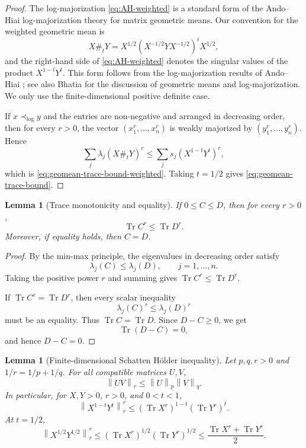 \documentclass[11pt]{amsart}
\numberwithin{equation}{section}
\newtheorem{lemma}[theorem]{Lemma}
\newcommand{\Tr}{\operatorname{Tr}}
\newcommand{\norm}[1]{\left\lVert #1\right\rVert}
\begin{document}
\begin{proof}
The log-majorization \eqref{eq:AH-weighted} is a standard form of the Ando--Hiai log-majorization theory for matrix geometric means.  Our convention for the weighted geometric mean is
\[
    X\#_tY=X^{1/2}(X^{-1/2}YX^{-1/2})^tX^{1/2},
\]
and the right-hand side of \eqref{eq:AH-weighted} denotes the singular values of the product \(X^{1-t}Y^t\).  This form follows from the log-majorization results of Ando--Hiai \cite{AndoHiai1994}; see also Bhatia \cite[Chapter IX]{Bhatia1997} for the discussion of geometric means and log-majorization.  We only use the finite-dimensional positive definite case.

If \(x\prec_{\log}y\) and the entries are non-negative and arranged in decreasing order, then for every \(r>0\), the vector \((x_1^r,\ldots,x_n^r)\) is weakly majorized by \((y_1^r,\ldots,y_n^r)\).  Hence
\[
    \sum_j \lambda_j(X\#_tY)^r
    \le
    \sum_j s_j(X^{1-t}Y^t)^r,
\]
which is \eqref{eq:geomean-trace-bound-weighted}.  Taking \(t=1/2\) gives \eqref{eq:geomean-trace-bound}.
\end{proof}

\begin{lemma}[Trace monotonicity and equality]\label{lem:trace-monotone}
If \(0\le C\le D\), then for every \(r>0\),
\[
    \Tr C^r\le \Tr D^r.
\]
Moreover, if equality holds, then \(C=D\).
\end{lemma}

\begin{proof}
By the min-max principle, the eigenvalues in decreasing order satisfy
\[
    \lambda_j(C)\le \lambda_j(D),\qquad j=1,\ldots,n.
\]
Taking the positive power \(r\) and summing gives \(\Tr C^r\le \Tr D^r\).

If \(\Tr C^r=\Tr D^r\), then every scalar inequality
\[
    \lambda_j(C)^r\le \lambda_j(D)^r
\]
must be an equality.  Thus \(\Tr C=\Tr D\).  Since \(D-C\ge 0\), we get
\[
    \Tr(D-C)=0,
\]
and hence \(D-C=0\).
\end{proof}

\begin{lemma}[Finite-dimensional Schatten H\"older inequality]\label{lem:holder}
Let \(p,q,r>0\) and \(1/r=1/p+1/q\).  For all compatible matrices \(U,V\),
\[
    \norm{UV}_r\le \norm{U}_p\norm{V}_q.
\]
In particular, for \(X,Y>0\), \(r>0\), and \(0<t<1\),
\begin{equation}\label{eq:holder-weighted-special}
    \norm{X^{1-t}Y^t}_r^r
    \le
    (\Tr X^r)^{1-t}(\Tr Y^r)^t.
\end{equation}
At \(t=1/2\),
\begin{equation}\label{eq:holder-special}
    \norm{X^{1/2}Y^{1/2}}_r^r
    \le
    (\Tr X^r)^{1/2}(\Tr Y^r)^{1/2}
    \le
    \frac{\Tr X^r+\Tr Y^r}{2}.
\end{equation}
\end{lemma}
\end{document}
